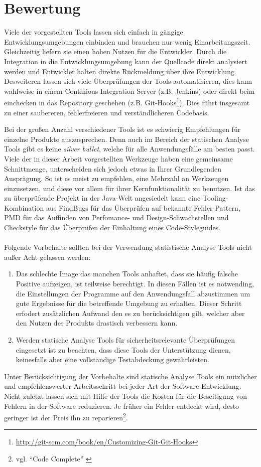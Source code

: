 \section{Bewertung}
Viele der vorgestellten Tools lassen sich einfach in gängige Entwicklungsumgebungen einbinden und brauchen nur wenig Einarbeitungszeit. Gleichzeitig liefern sie einen hohen Nutzen für die Entwickler. 
Durch die Integration in die Entwicklungsumgebung kann der Quellcode direkt analysiert werden und Entwickler halten direkte Rückmeldung über ihre Entwicklung. Desweiteren lassen sich viele Überprüfungen der Tools automatisieren, dies kann wahlweise in einem Continious Integration Server (z.B. Jenkins) oder direkt beim einchecken in das Repository geschehen (z.B. Git-Hooks\footnote{\url{http://git-scm.com/book/en/Customizing-Git-Git-Hooks}}). Dies führt insgesamt zu einer saubereren, fehlerfreieren und verständlicheren Codebasis.

Bei der großen Anzahl verschiedener Tools ist es schwierig Empfehlungen für einzelne Produkte auszusprechen. Denn auch im Bereich der statischen Analyse Tools gibt es keine \emph{silver bullet}, welche für alle Anwendungsfälle am besten passt. Viele der in dieser Arbeit vorgestellten Werkzeuge haben eine gemeinsame Schnittmenge, unterscheiden sich jedoch etwas in Ihrer Grundlegenden Ausprägung. So ist es meist zu empfehlen, eine Mehrzahl an Werkzeugen einzusetzen, und diese vor allem für ihrer Kernfunktionalität zu benutzen.
Ist das zu überprüfende Projekt in der Java-Welt angesiedelt kann eine Tooling-Kombination aus FindBugs für das Überprüfen auf bekannte Fehler-Pattern, PMD für das Auffinden von Perfomance- und Design-Schwachstellen und Checkstyle für das Überprüfen der Einhaltung eines Code-Styleguides.\\\\

Folgende Vorbehalte sollten bei der Verwendung statistische Analyse Tools nicht außer Acht gelassen werden:
\begin{enumerate}
  \item Das schlechte Image das manchen Tools anhaftet, dass sie häufig falsche Positive aufzeigen, ist teilweise berechtigt. In diesen Fällen ist es notwending, die Einstellungen der Programme auf den Anwendungsfall abzustimmen um gute Ergebnisse für die betreffende Umgebung zu erhalten. Dieser Schritt erfodert zusätzlichen Aufwand den es zu berücksichtigen gilt, welcher aber den Nutzen des Produkts drastisch verbessern kann.
  \item Werden statische Analyse Tools für sicherheitsrelevante Überprüfungen eingesetzt ist zu beachten, dass diese Tools der Unterstützung dienen, keinesfalls aber eine vollständige Testabdeckung gewährleisten.
\end{enumerate}

Unter Berücksichtigung der Vorbehalte sind statische Analyse Tools ein nützlicher und empfehlenswerter Arbeitsschritt bei jeder  Art der Software Entwicklung. Nicht zuletzt lassen sich mit Hilfe der Tools die Kosten für die Beseitigung von Fehlern in der Software reduzieren. Je früher ein Fehler entdeckt wird, desto geringer ist der Preis ihn zu reparieren\footnote{vgl. ``Code Complete'' \citep{mcconnell2004}}.
